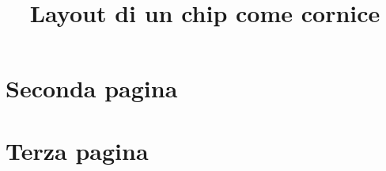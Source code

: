 \documentclass[a4paper,11pt]{article}
\title{Layout di un chip come cornice}
\author{}
\date{}
\begin{document}
\maketitle
\lipsum[1-6]
\newpage
\section{Seconda pagina}
\lipsum[7-12]
\newpage
\section{Terza pagina}
\lipsum[13-18]
\end{document}
